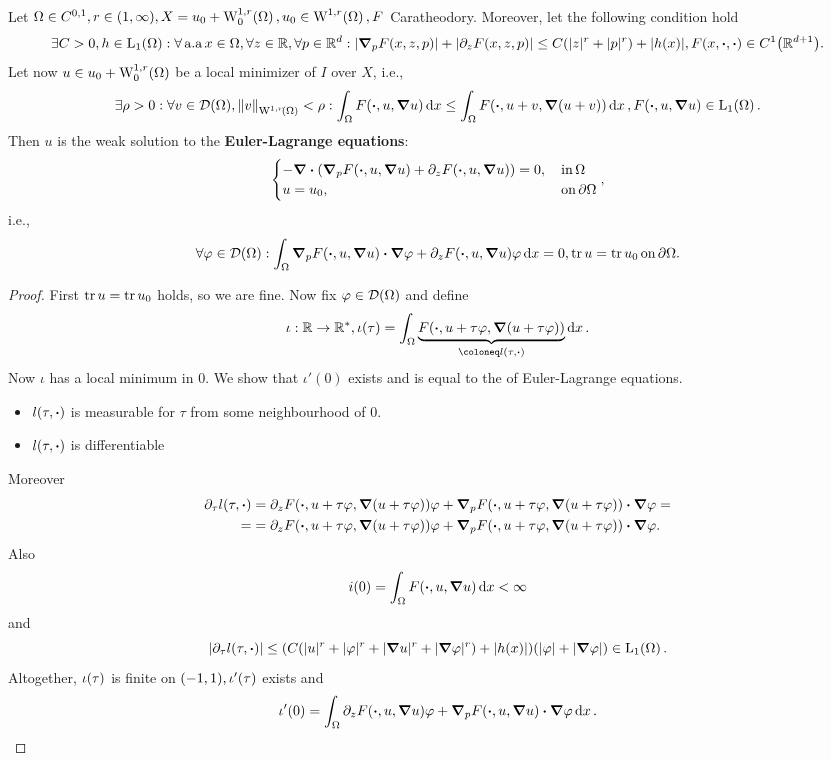 \documentclass{article}
\begin{document}
\begin{lemma}
	Let $\Omega \in C^{0,1}, r \in(1,\infty), X = u_0 + \WkpzeroSet[1][r]{\Omega}, u_0 \in \WkpSet[1][r]{\Omega}, F$ Caratheodory. Moreover, let the following condition hold
	\[
		\exists C>0, h \in \LpSet[1]{\Omega}: \forall \, \text{a.a} \, x \in \Omega, \forall z \in \R, \forall p \in \R^d: |\grad_p F(x,z,p)|+|\partial_{z} F(x,z,p)| \leq C\qty(|z|^r + |p|^r)+ |h(x)|, F(x,\vdot, \vdot) \in C^1\qty(\R^{d+1}).
	\]
	Let now $u \in u_0 + \WkpzeroSet[1][r]{\Omega}$ be a local minimizer of $I$ over $X$, i.e.,
	\[
		\exists \rho>0: \forall v \in \mathcal{D}\qty(\Omega), \norm{v}_{\WkpSet[1][r]{\Omega}} < \rho: \int_{\Omega}F\qty(\vdot, u, \grad u)\dd{x} \leq \int_{\Omega}F\qty(\vdot, u+v, \grad\qty(u+v))\dd{x}, F\qty(\vdot, u, \grad u) \in \LpSet[1]{\Omega}.
	\]
	Then $u$ is the weak solution to the \textbf{Euler-Lagrange equations}:
	\[
		\begin{cases}
			- \divergence{\qty(\grad_p F\qty(\vdot, u, \grad u)+ \partial_{z}F\qty(\vdot, u, \grad u))} = 0, & \, \text{in} \, \Omega \\
			u = u_0, & \, \text{on} \, \partial \Omega
		\end{cases},
	\]
	i.e.,
	\[
		\forall \varphi \in \mathcal{D}\qty(\Omega): \int_{\Omega}\grad_p F\qty(\vdot, u, \grad u) \vdot \grad \varphi + \partial_{z}F\qty(\vdot, u, \grad u) \varphi \dd{x} = 0, \tr u = \tr u_0 \, \text{on} \, \partial \Omega.
	\]
\end{lemma}
\begin{proof}
	First $\tr u = \tr u_0$ holds, so we are fine. Now fix $\varphi \in \mathcal{D}\qty(\Omega)$ and define
	\[
		\iota:\R \to \R^{*}, \iota\qty(\tau) = \int_{\Omega}\underbrace{F\qty(\vdot, u + \tau \varphi, \grad \qty(u+ \tau \varphi))}_{\coloneq l\qty(\tau, \vdot)}\dd{x}.
	\]
	Now $\iota$ has a local minimum in $0$. We show that $\iota'(0)$ exists and is equal to the of Euler-Lagrange equations. 
	\begin{itemize}
		\item $l\qty(\tau, \vdot)$ is measurable for $\tau$ from some neighbourhood of $0$.
		\item $l\qty(\tau, \vdot)$ is differentiable
	\end{itemize}
	Moreover
	\begin{align*}
		\partial_{\tau}l\qty(\tau, \vdot) &= \partial_{z}F\qty(\vdot, u+\tau \varphi, \grad\qty(u+\tau \varphi))\varphi + \grad_p F\qty(\vdot, u+\tau \varphi, \grad\qty(u+\tau \varphi))\vdot \grad \varphi =\\ =
						  & = \partial_{z}F\qty(\vdot, u+\tau \varphi, \grad \qty(u+\tau \varphi))\varphi + \grad_p F\qty(\vdot, u+\tau \varphi, \grad\qty(u+\tau \varphi))\vdot \grad \varphi.
	\end{align*}
	Also
	\[
		i(0) = \int_{\Omega}F\qty(\vdot, u, \grad u)\dd{x} < \infty
	\]
	and
	\[
		|\partial_{\tau} l(\tau, \vdot)| \leq (C(|u|^r+|\varphi|^r+|\grad u|^r + |\grad \varphi|^r)+|h(x)|)(|\varphi|+|\grad \varphi|) \in \LpSet[1]{\Omega}.
	\]
	Altogether, $\iota\qty(\tau)$ is finite on $(-1,1), \iota'\qty(\tau)$ exists and
	\[
		\iota'\qty(0) = \int_{\Omega}\partial_{z}F\qty(\vdot, u, \grad u)\varphi + \grad_p F\qty(\vdot, u, \grad u) \vdot \grad \varphi\dd{x}.
	\]
\end{proof}
\end{document}

